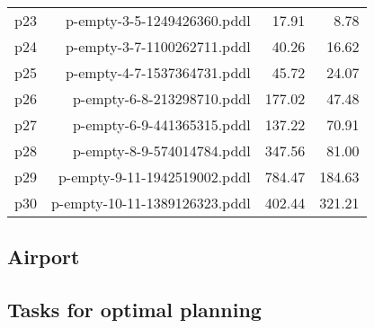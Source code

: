 \documentclass{article}
\begin{document}
\begin{center}
\begin{tabular}{@{}l|r|r|r@{}}
  p23& p-empty-3-5-1249426360.pddl&17.91&8.78\\
  p24& p-empty-3-7-1100262711.pddl&40.26&16.62\\
  p25& p-empty-4-7-1537364731.pddl&45.72&24.07\\
  p26& p-empty-6-8-213298710.pddl&177.02&47.48\\
  p27& p-empty-6-9-441365315.pddl&137.22&70.91\\
  p28& p-empty-8-9-574014784.pddl&347.56&81.00\\
  p29& p-empty-9-11-1942519002.pddl&784.47&184.63\\
  p30& p-empty-10-11-1389126323.pddl&402.44&321.21
                            \end{tabular}
                            \end{center}
                    
                \newpage \subsection{Airport}
                    \subsection*{Tasks for optimal planning}
                    
\end{document}

